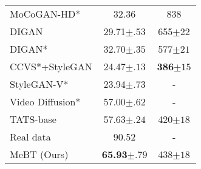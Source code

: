 \documentclass[10pt,twocolumn,letterpaper]{article}
\begin{document}
\begin{table*}[!ht]
\begin{subtable}[h]{0.43\textwidth}
\begin{tabular}{lcc}
MoCoGAN-HD*  & 32.36 & 838 \\
DIGAN & 29.71\tiny{$\pm .53$}   & 655\tiny{$\pm 22$}   \\
DIGAN*  & 32.70\tiny{$\pm .35$}   & 577\tiny{$\pm 21$}   \\
CCVS*+StyleGAN  & 24.47\tiny{$\pm .13$} & \bf{386}\tiny{$\pm 15$} \\
StyleGAN-V*  & 23.94\tiny{$\pm .73$} & - \\
Video Diffusion*  & 57.00\tiny{$\pm .62$} & - \\
TATS-base & 57.63\tiny{$\pm .24$} & 420\tiny{$\pm 18$} \\ \hline
Real data & 90.52 & - \\ \hline
MeBT (Ours) & \bf{65.93}\tiny{$\pm .79$} & 438\tiny{$\pm 18$}\\
\bottomrule
\end{tabular}
\end{subtable}
\vspace{-0.3cm}
\end{table*} 
\end{document}
